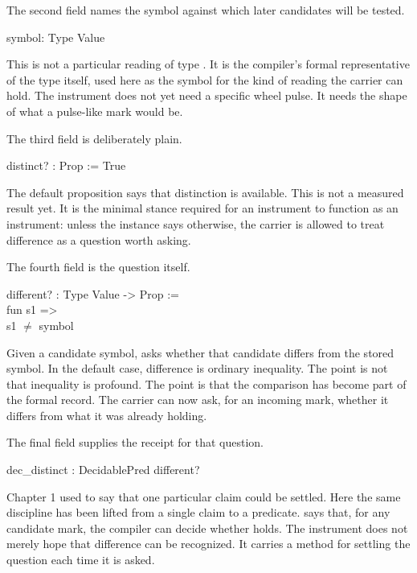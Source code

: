 The second field names the symbol against which later candidates will be
tested.

\begin{leancode}
symbol: Type Value
\end{leancode}

This is not a particular reading of type . It is the compiler's
formal representative of the type itself, used here as the symbol for the kind
of reading the carrier can hold. The instrument does not yet need a specific
wheel pulse. It needs the shape of what a pulse-like mark would be.

The third field is deliberately plain.

\begin{leancode}
distinct? : Prop := True
\end{leancode}

The default proposition says that distinction is available. This is not a
measured result yet. It is the minimal stance required for an instrument to
function as an instrument: unless the instance says otherwise, the carrier is
allowed to treat difference as a question worth asking.

The fourth field is the question itself.

\begin{leancode}
different? : Type Value -> Prop :=\\
\quad fun s1 =>\\
\quad\quad s1 \(\neq\) symbol
\end{leancode}

Given a candidate symbol,  asks whether that candidate differs
from the stored symbol. In the default case, difference is ordinary inequality.
The point is not that inequality is profound. The point is that the comparison
has become part of the formal record. The carrier can now ask, for an incoming
mark, whether it differs from what it was already holding.

The final field supplies the receipt for that question.

\begin{leancode}
dec\_distinct : DecidablePred different?
\end{leancode}

Chapter 1 used  to say that one particular claim could be
settled. Here the same discipline has been lifted from a single claim to a
predicate.  says that, for any candidate mark,
the compiler can decide whether  holds. The instrument does
not merely hope that difference can be recognized. It carries a method for
settling the question each time it is asked.

